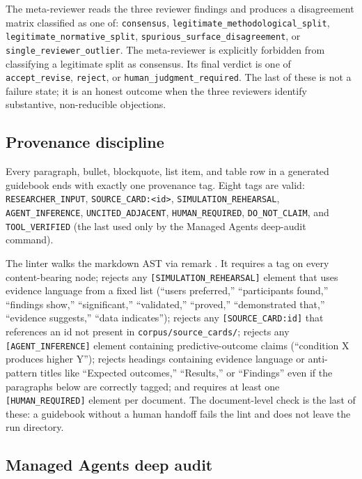 The meta-reviewer reads the three reviewer findings and produces a disagreement matrix classified as one of: \texttt{consensus}, \texttt{legitimate\_methodological\_split}, \texttt{legitimate\_normative\_split}, \texttt{spurious\_surface\_disagreement}, or \texttt{single\_reviewer\_outlier}. The meta-reviewer is explicitly forbidden from classifying a legitimate split as consensus. Its final verdict is one of \texttt{accept\_revise}, \texttt{reject}, or \texttt{human\_judgment\_required}. The last of these is not a failure state; it is an honest outcome when the three reviewers identify substantive, non-reducible objections.

\subsection{Provenance discipline}

Every paragraph, bullet, blockquote, list item, and table row in a generated guidebook ends with exactly one provenance tag. Eight tags are valid: \texttt{RESEARCHER\_INPUT}, \texttt{SOURCE\_CARD:<id>}, \texttt{SIMULATION\_REHEARSAL}, \texttt{AGENT\_INFERENCE}, \texttt{UNCITED\_ADJACENT}, \texttt{HUMAN\_REQUIRED}, \texttt{DO\_NOT\_CLAIM}, and \texttt{TOOL\_VERIFIED} (the last used only by the Managed Agents deep-audit command).

The linter walks the markdown AST via remark \citep{remark}. It requires a tag on every content-bearing node; rejects any \texttt{[SIMULATION\_REHEARSAL]} element that uses evidence language from a fixed list (``users preferred,'' ``participants found,'' ``findings show,'' ``significant,'' ``validated,'' ``proved,'' ``demonstrated that,'' ``evidence suggests,'' ``data indicates''); rejects any \texttt{[SOURCE\_CARD:id]} that references an id not present in \texttt{corpus/source\_cards/}; rejects any \texttt{[AGENT\_INFERENCE]} element containing predictive-outcome claims (``condition X produces higher Y''); rejects headings containing evidence language or anti-pattern titles like ``Expected outcomes,'' ``Results,'' or ``Findings'' even if the paragraphs below are correctly tagged; and requires at least one \texttt{[HUMAN\_REQUIRED]} element per document. The document-level check is the last of these: a guidebook without a human handoff fails the lint and does not leave the run directory.

\subsection{Managed Agents deep audit}

